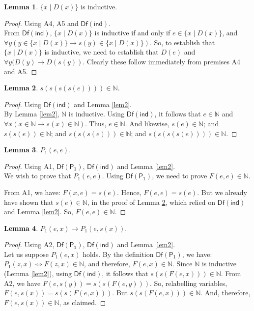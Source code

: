 \documentclass[11pt,a4paper]{article}
\newcommand{\N}{ \ensuremath{ \mathbb{N}}}
\theoremstyle{definition}
\newtheorem{lem}{Lemma}
\begin{document}
\begin{lem}\label{lem3} $\{x \mid D(x)\}$ is inductive.\end{lem}
\begin{proof} Using A4, A5 and $\mathsf{Df(ind)}$.\\
From $\mathsf{Df(ind)}$, $\{x \mid D(x)\}$ is inductive if and only if $e \in \{x \mid D(x)\}$, and $\forall y(y \in \{x \mid D(x)\} \to s(y) \in \{x \mid D(x)\})$. So, to establish that $\{x \mid D(x)\}$ is inductive, we need to establish that $D(e)$ and $\forall y(D(y) \to D(s(y))$. Clearly these follow immediately from premises A4 and A5.
\end{proof}

\begin{lem}\label{lem4} $s(s(s(s(e)))) \in \N$.\end{lem}
\begin{proof} Using $\mathsf{Df(ind)}$ and Lemma \ref{lem2}.\\
By Lemma \ref{lem2}, $\N$ is inductive. Using $\mathsf{Df(ind)}$, it follows that $e \in \N$ and $\forall x (x \in \N \to s(x) \in \N)$. Thus, $e \in \N$. And likewise, $s(e) \in \N$; and $s(s(e)) \in \N$; and $s(s(s(e))) \in \N$; and $s(s(s(s(e)))) \in \N$.
\end{proof}

\begin{lem}\label{lem5} $P_1(e,e)$.\end{lem}
\begin{proof} Using A1, $\mathsf{Df(P_1)}$, $\mathsf{Df(ind)}$ and Lemma \ref{lem2}.\\
We wish to prove that $P_1(e,e)$. Using $\mathsf{Df(P_1)}$, we need to prove $F(e, e) \in \N$. 

From A1, we have: $F(x, e) = s(e)$. Hence, $F(e, e) = s(e)$. But we already have shown that $s(e) \in \N$, in the proof of Lemma \ref{lem4}, which relied on $\mathsf{Df(ind)}$ and Lemma \ref{lem2}. So, $F(e, e) \in \N$.
 \end{proof}

\begin{lem}\label{lem6} $P_1(e, x) \to P_1(e, s(x))$.\end{lem}
\begin{proof} Using A2, $\mathsf{Df(P_1)}$, $\mathsf{Df(ind)}$ and Lemma \ref{lem2}.\\
Let us suppose $P_1(e, x)$ holds. By the definition $\mathsf{Df(P_1)}$, we have: $P_1(z, x) \iff F(z, x) \in \N$, and  therefore, $F(e, x) \in \N$. Since $\N$ is inductive (Lemma \ref{lem2}), using $\mathsf{Df(ind)}$, it follows that $s(s(F(e, x))) \in \N$. From A2, we have $F(e, s(y)) = s(s(F(e, y)))$. So, relabelling variables, $F(e, s(x)) = s(s(F(e, x)))$.
But  $s(s(F(e, x))) \in \N$. And, therefore, $F(e, s(x)) \in \N$, as claimed.
\end{proof}
\end{document}
